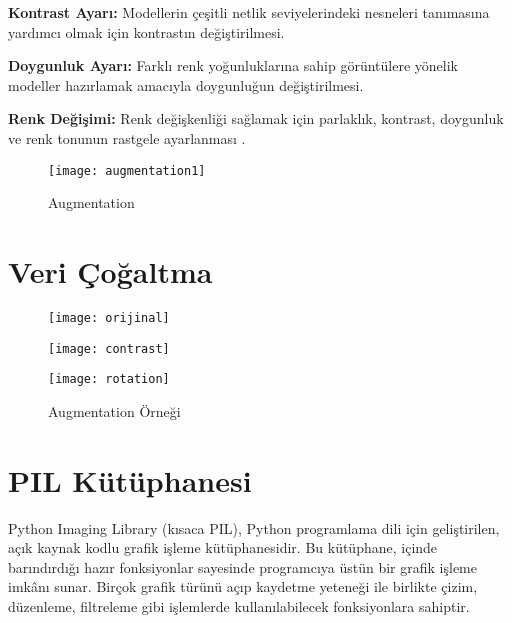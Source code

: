 \documentclass[11pt,a4paper]{report}
\begin{document}
\begin{justify}
 	\textbf{Kontrast Ayarı:} Modellerin çeşitli netlik seviyelerindeki nesneleri tanımasına yardımcı olmak için kontrastın değiştirilmesi.\newline
 	
 	\textbf{Doygunluk Ayarı:} Farklı renk yoğunluklarına sahip görüntülere yönelik modeller hazırlamak amacıyla doygunluğun değiştirilmesi.\newline
 	
 	\textbf{Renk Değişimi:} Renk değişkenliği sağlamak için parlaklık, kontrast, doygunluk ve renk tonunun rastgele ayarlanması \cite{Augmentation2}.
 	\begin{figure}[!h]
 		\centering
 		\texttt{[image: augmentation1]}
 		\caption{Augmentation \cite{Augmentation1}}
 		
 	\end{figure}
 	\clearpage
 
 	\section{Veri Çoğaltma}
 	\begin{figure}[!h]
 		\centering
 		\begin{minipage}[b]{0.48\textwidth}
 			\centering
 			\texttt{[image: orijinal]}
 		\end{minipage}
 		\hspace{0.04\textwidth}
 		\begin{minipage}[b]{0.48\textwidth}
 			\centering
 			\texttt{[image: contrast]}
 		\end{minipage}
 		\vspace{0.04\textwidth}
 		\begin{minipage}[b]{0.48\textwidth}
 			\centering
 			\texttt{[image: rotation]}
 		\end{minipage}
 		\caption{Augmentation Örneği}
 	\end{figure}
 	\clearpage
 	\section{PIL Kütüphanesi}
 	Python Imaging Library (kısaca PIL), Python programlama dili için geliştirilen, açık kaynak kodlu grafik işleme kütüphanesidir. Bu kütüphane, içinde barındırdığı hazır fonksiyonlar sayesinde programcıya üstün bir grafik işleme imkânı sunar. Birçok grafik türünü açıp kaydetme yeteneği ile birlikte çizim, düzenleme, filtreleme gibi işlemlerde kullanılabilecek fonksiyonlara sahiptir\cite{PIL}.
 	\newline
 	

\end{justify}
\end{document}
